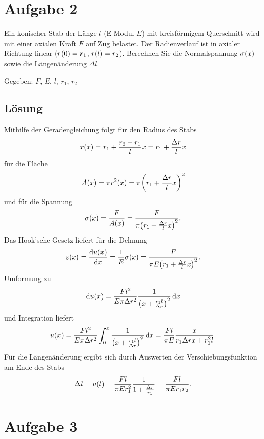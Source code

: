 \documentclass{exercise}
\begin{document}
    
    \section*{Aufgabe 2}
    
    \begin{problem}
        Ein konischer Stab der Länge \(l\) (E-Modul \(E\)) mit kreisförmigem Querschnitt wird mit einer axialen Kraft \(F\) auf Zug belastet.
        Der Radienverlauf ist in axialer Richtung linear (\(r\parentheses*{0} = r_1\), \(r\parentheses*{l} = r_2\)).
        Berechnen Sie die Normalspannung \(\sigma\parentheses*{x}\) sowie die Längenänderung \(\Delta l\).
        
        Gegeben: \(F\), \(E\), \(l\), \(r_1\), \(r_2\)
    \end{problem}
    
    \subsection*{Lösung}
    Mithilfe der Geradengleichung folgt für den Radius des Stabs
    \[
        r\parentheses*{x} = r_1 + \frac{r_2 - r_1}{l}x = r_1 + \frac{\Delta r}{l}x
    \]
    für die Fläche
    \[
        A\parentheses*{x} = \pi r^2\parentheses*{x} = \pi\parentheses*{r_1 + \frac{\Delta r}{l}x}^2
    \]
    und für die Spannung
    \[
        \sigma\parentheses*{x} = \frac{F}{A\parentheses*{x}} = \frac{F}{\pi\parentheses*{r_1 + \frac{\Delta r}{l}x}^2}.
    \]
    Das Hook'sche Gesetz liefert für die Dehnung
    \[
        \varepsilon\parentheses*{x} = \frac{\d u\parentheses*{x}}{\d x} = \frac{1}{E}\sigma\parentheses*{x} = \frac{F}{\pi E\parentheses*{r_1 + \frac{\Delta r}{l} x}^2}.
    \]
    Umformung zu
    \[
        \d u\parentheses*{x} = \frac{Fl^2}{E\pi\Delta r^2}\frac{1}{\parentheses*{x + \frac{r_1 l}{\Delta r}}^2}\d x
    \]
    und Integration liefert
    \[
        u\parentheses*{x} = \frac{Fl^2}{E\pi\Delta r^2}\int_0^x \frac{1}{\parentheses*{x + \frac{r_1 l}{\Delta r}}^2}\d x = \frac{Fl}{\pi E}\frac{x}{r_1 \Delta rx + r_1^2 l}.
    \]
    Für die Längenänderung ergibt sich durch Auswerten der Verschiebungsfunktion am Ende des Stabs
    \[
        \Delta l = u\parentheses*{l} = \frac{Fl}{\pi Er_1^2}\frac{1}{1 + \frac{\Delta r}{r_1}} = \frac{Fl}{\pi Er_1 r_2}.
    \]
    
    
    \section*{Aufgabe 3}
    
\end{document}
